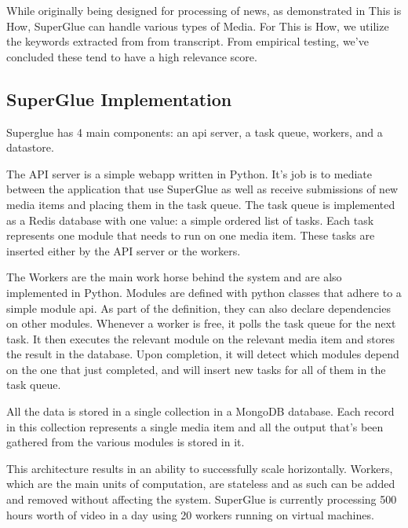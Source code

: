 While originally being designed for processing of news, as demonstrated in This is How, SuperGlue can handle various types of Media. For This is How, we utilize the keywords extracted from from transcript. From empirical testing, we've concluded these tend to have a high relevance score.    

\subsection{SuperGlue Implementation}

Superglue has 4 main components: an api server, a task queue, workers, and a datastore. 

The API server is a simple webapp written in Python. It's job is to mediate between the application that use SuperGlue as well as receive submissions of new media items and placing them in the task queue. The task queue is implemented as a Redis database with one value: a simple ordered list of tasks. Each task represents one module that needs to run on one media item. These tasks are inserted either by the API server or the workers. 

The Workers are the main work horse behind the system and are also implemented in Python. Modules are defined with python classes that adhere to a simple module api. As part of the definition, they can also declare dependencies on other modules. Whenever a worker is free, it polls the task queue for the next task. It then executes the relevant module on the relevant media item and stores the result in the database. Upon completion, it will detect which modules depend on the one that just completed, and will insert new tasks for all of them in the task queue. 


All the data is stored in a single collection in a MongoDB database. Each record in this collection represents a single media item and all the output that's been gathered from the various modules is stored in it. 

This architecture results in an ability to successfully scale horizontally. Workers, which are the main units of computation, are stateless and as such can be added and removed without affecting the system. SuperGlue is currently processing 500 hours worth of video in a day using 20 workers running on virtual machines.